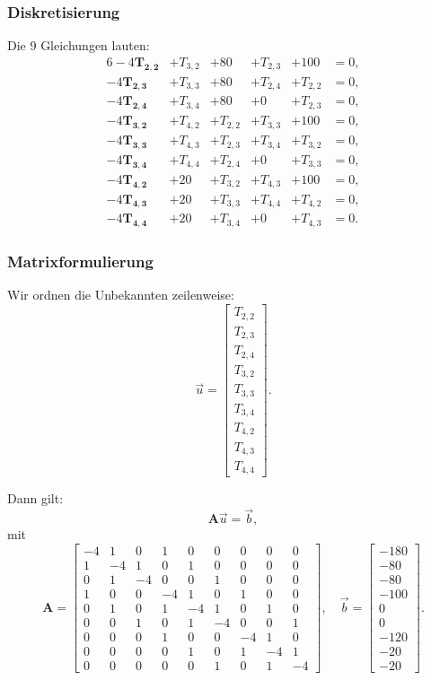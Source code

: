 \subsubsection*{Diskretisierung}
Die 9 Gleichungen lauten:
\begin{alignat*}{6}
	-4\mathbf{T_{2,2}} &+ T_{3,2} &+ 80 &+ T_{2,3} &+ 100 &= 0, \\
	-4\mathbf{T_{2,3}} &+ T_{3,3} &+ 80 &+ T_{2,4} &+ T_{2,2} &= 0, \\
	-4\mathbf{T_{2,4}} &+ T_{3,4} &+ 80 &+ 0 &+ T_{2,3} &= 0, \\
	-4\mathbf{T_{3,2}} &+ T_{4,2} &+ T_{2,2} &+ T_{3,3} &+ 100 &= 0, \\
	-4\mathbf{T_{3,3}} &+ T_{4,3} &+ T_{2,3} &+ T_{3,4} &+ T_{3,2} &= 0, \\
	-4\mathbf{T_{3,4}} &+ T_{4,4} &+ T_{2,4} &+ 0 &+ T_{3,3} &= 0, \\
	-4\mathbf{T_{4,2}} &+ 20 &+ T_{3,2} &+ T_{4,3} &+ 100 &= 0, \\
	-4\mathbf{T_{4,3}} &+ 20 &+ T_{3,3} &+ T_{4,4} &+ T_{4,2} &= 0, \\
	-4\mathbf{T_{4,4}} &+ 20 &+ T_{3,4} &+ 0 &+ T_{4,3} &= 0.
\end{alignat*}

\subsubsection*{Matrixformulierung}
Wir ordnen die Unbekannten zeilenweise:
\[
\vec{u} =
\begin{bmatrix}
	T_{2,2}\\T_{2,3}\\T_{2,4}\\
	T_{3,2}\\T_{3,3}\\T_{3,4}\\
	T_{4,2}\\T_{4,3}\\T_{4,4}
\end{bmatrix}.
\]

Dann gilt:
\[
\mathbf{A}\vec{u}=\vec{b},
\]
mit
\[
\mathbf{A}=
\begin{bmatrix}
	-4& 1& 0& 1& 0& 0& 0& 0& 0\\
	1&-4& 1& 0& 1& 0& 0& 0& 0\\
	0& 1&-4& 0& 0& 1& 0& 0& 0\\
	1& 0& 0&-4& 1& 0& 1& 0& 0\\
	0& 1& 0& 1&-4& 1& 0& 1& 0\\
	0& 0& 1& 0& 1&-4& 0& 0& 1\\
	0& 0& 0& 1& 0& 0&-4& 1& 0\\
	0& 0& 0& 0& 1& 0& 1&-4& 1\\
	0& 0& 0& 0& 0& 1& 0& 1&-4
\end{bmatrix},
\quad
\vec{b}=
\begin{bmatrix}
	-180\\-80\\-80\\
	-100\\0\\0\\
	-120\\-20\\-20
\end{bmatrix}.
\]

